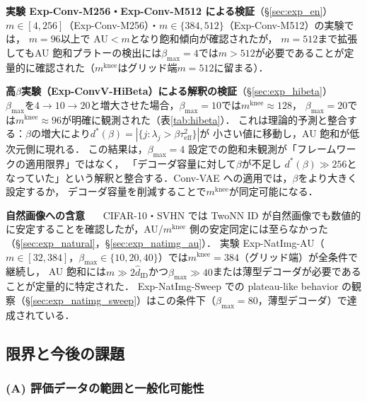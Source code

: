 \documentclass[11pt,a4paper]{jsarticle}
\newcommand{\mknee}{m^{\mathrm{knee}}}
\begin{document}
\textbf{実験 Exp-Conv-M256・Exp-Conv-M512 による検証}（§\ref{sec:exp_en}）~~~
$m \in [4,256]$（Exp-Conv-M256）・$m \in \{384,512\}$（Exp-Conv-M512）の実験では，
$m = 96$以上で AU$<m$となり飽和傾向が確認されたが，
$m=512$まで拡張してもAU 飽和プラトーの検出には$\beta_{\max}=4$では$m>512$が必要であることが定量的に確認された（$\mknee$はグリッド端$m=512$に留まる）．

\textbf{高$\beta$実験（Exp-ConvV-HiBeta）による解釈の検証}（§\ref{sec:exp_hibeta}）~~~
$\beta_{\max}$を$4\to10\to20$と増大させた場合，$\beta_{\max}=10$では$\mknee \approx 128$，
$\beta_{\max}=20$では$\mknee \approx 96$が明確に観測された（表\ref{tab:hibeta}）．
これは理論的予測と整合する：$\beta$の増大により$d^*(\beta) = |\{j: \lambda_j > \beta\tau^2_\mathrm{eff}\}|$が
小さい値に移動し，AU 飽和が低次元側に現れる．
この結果は，$\beta_{\max}=4$ 設定での飽和未観測が「フレームワークの適用限界」ではなく，
「デコーダ容量に対して$\beta$が不足し $d^*(\beta) \gg 256$となっていた」という解釈と整合する．Conv-VAE への適用では，$\beta$をより大きく設定するか，
デコーダ容量を削減することで$\mknee$が同定可能になる．


\textbf{自然画像への含意}~~~
CIFAR-10・SVHN では TwoNN ID が自然画像でも数値的に安定することを確認したが，AU/$\mknee$ 側の安定同定には至らなかった（§\ref{sec:exp_natural}，§\ref{sec:exp_natimg_au}）．
実験 Exp-NatImg-AU（$m \in [32, 384]$，$\beta_{\max} \in \{10,20,40\}$）では$\mknee = 384$（グリッド端）が全条件で継続し，
AU 飽和には$m \gg 2\hat{d}_\mathrm{ID}$かつ$\beta_{\max} \gg 40$または薄型デコーダが必要であることが定量的に特定された．
Exp-NatImg-Sweep での plateau-like behavior の観察（§\ref{sec:exp_natimg_sweep}）はこの条件下（$\beta_{\max}=80$，薄型デコーダ）で達成されている．

\subsection{限界と今後の課題}\label{sec:disc_limitation}

\subsubsection*{(A) 評価データの範囲と一般化可能性}
\end{document}
